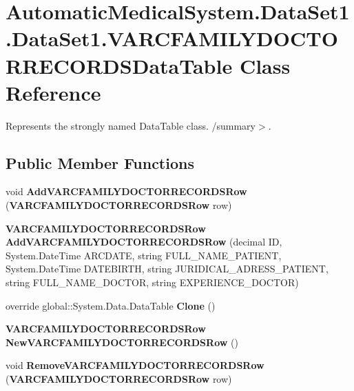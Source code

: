 \section{AutomaticMedicalSystem.DataSet1.DataSet1.VARCFAMILYDOCTORRECORDSDataTable Class Reference}
\label{class_automatic_medical_system_1_1_data_set1_1_1_v_a_r_c_f_a_m_i_l_y_d_o_c_t_o_r_r_e_c_o_r_d_s_data_table}
Represents the strongly named DataTable class. /summary$>$.  


\subsection*{Public Member Functions}
\begin{CompactItemize}
\item 
void \textbf{AddVARCFAMILYDOCTORRECORDSRow} ({\bf VARCFAMILYDOCTORRECORDSRow} row)\label{class_automatic_medical_system_1_1_data_set1_1_1_v_a_r_c_f_a_m_i_l_y_d_o_c_t_o_r_r_e_c_o_r_d_s_data_table_92a9f0d02ddb76324b88a63ef01fd180}

\item 
{\bf VARCFAMILYDOCTORRECORDSRow} \textbf{AddVARCFAMILYDOCTORRECORDSRow} (decimal ID, System.DateTime ARCDATE, string FULL\_\-NAME\_\-PATIENT, System.DateTime DATEBIRTH, string JURIDICAL\_\-ADRESS\_\-PATIENT, string FULL\_\-NAME\_\-DOCTOR, string EXPERIENCE\_\-DOCTOR)\label{class_automatic_medical_system_1_1_data_set1_1_1_v_a_r_c_f_a_m_i_l_y_d_o_c_t_o_r_r_e_c_o_r_d_s_data_table_5a0e651d9a4ba0eda8bd946b97bb964b}

\item 
override global::System.Data.DataTable \textbf{Clone} ()\label{class_automatic_medical_system_1_1_data_set1_1_1_v_a_r_c_f_a_m_i_l_y_d_o_c_t_o_r_r_e_c_o_r_d_s_data_table_e7d70fc6975333f54e110a323837301b}

\item 
{\bf VARCFAMILYDOCTORRECORDSRow} \textbf{NewVARCFAMILYDOCTORRECORDSRow} ()\label{class_automatic_medical_system_1_1_data_set1_1_1_v_a_r_c_f_a_m_i_l_y_d_o_c_t_o_r_r_e_c_o_r_d_s_data_table_0f034f25c80cc52a36db24794ecdcb9e}

\item 
void \textbf{RemoveVARCFAMILYDOCTORRECORDSRow} ({\bf VARCFAMILYDOCTORRECORDSRow} row)\label{class_automatic_medical_system_1_1_data_set1_1_1_v_a_r_c_f_a_m_i_l_y_d_o_c_t_o_r_r_e_c_o_r_d_s_data_table_93e1ee63a9053b1d0390fc6c1bac4461}

\end{CompactItemize}
